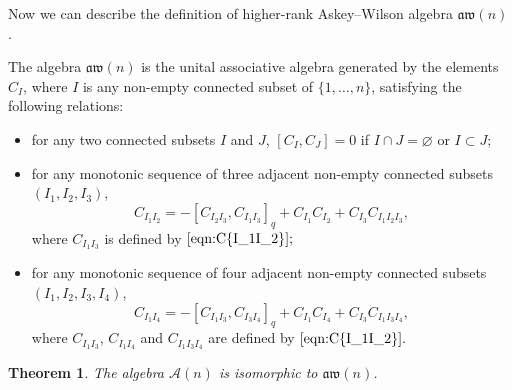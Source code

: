 \documentclass[10pt,a4paper]{amsart}
\numberwithin{equation}{section}
\def\A{\mathscr{A}}
\def\aw{\mathfrak{aw}}
\newtheorem{Theorem}{Theorem}[section]
\begin{document}
Now we can describe the definition of higher-rank Askey--Wilson algebra $\aw(n)$.

\begin{Definition} \label{defn:aw(n)}
The algebra $\aw(n)$ is the unital associative algebra generated by the elements $C_I$, where $I$ is any non-empty connected subset of $\{1, \ldots, n\}$, satisfying the following relations:
\begin{itemize}\itemsep=0pt
 \item for any two connected subsets $I$ and $J$,
$[C_I, C_J]=0$ if $I \cap J=\varnothing$ or $I \subset J$;
 \item for any monotonic sequence of three adjacent non-empty connected subsets $(I_1, I_2, I_3)$,
\begin{equation*}
C_{I_1 I_2}=-[C_{I_2 I_3}, C_{I_1 I_3}]_q+C_{I_1} C_{I_2}+C_{I_3} C_{I_1 I_2 I_3},
\end{equation*}
where $C_{I_1 I_3}$ is defined by $\eqref{eqn:C{I_1I_2}};$
 \item for any monotonic sequence of four adjacent non-empty connected subsets $(I_1, I_2, I_3, I_4)$,
\begin{equation*}
C_{I_1 I_4}=-\left[C_{I_1 I_3}, C_{I_3 I_4}\right]_q+C_{I_1} C_{I_4}+C_{I_3} C_{I_1 I_3 I_4},
\end{equation*}
where $C_{I_1 I_3}$, $C_{I_1 I_4}$ and $C_{I_1 I_3 I_4}$ are defined by $\eqref{eqn:C{I_1I_2}}.$
\end{itemize}
\end{Definition}


\begin{Theorem}
The algebra $\A(n)$ is isomorphic to $\aw(n)$.
\end{Theorem}
\end{document}
